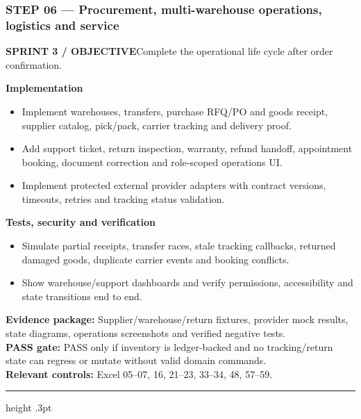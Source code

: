 \documentclass[10.5pt,a4paper,oneside]{article}
\newcommand{\eyebrow}[1]{{\sffamily\footnotesize\bfseries\color{gold}\MakeUppercase{#1}}}
\begin{document}
\subsubsection*{STEP 06 --- Procurement, multi-warehouse operations, logistics and service}
\eyebrow{Sprint 3 / objective}\quad Complete the operational life cycle after order confirmation.
\begin{tcolorbox}[colback=warm,colframe=line,boxrule=.45pt,arc=2pt,left=8pt,right=8pt,top=6pt,bottom=6pt]\textbf{Implementation}
\begin{itemize}
\item Implement warehouses, transfers, purchase RFQ/PO and goods receipt, supplier catalog, pick/pack, carrier tracking and delivery proof.
\item Add support ticket, return inspection, warranty, refund handoff, appointment booking, document correction and role-scoped operations UI.
\item Implement protected external provider adapters with contract versions, timeouts, retries and tracking status validation.
\end{itemize}
\textbf{Tests, security and verification}
\begin{itemize}
\item Simulate partial receipts, transfer races, stale tracking callbacks, returned damaged goods, duplicate carrier events and booking conflicts.
\item Show warehouse/support dashboards and verify permissions, accessibility and state transitions end to end.
\end{itemize}
\textbf{Evidence package:} Supplier/warehouse/return fixtures, provider mock results, state diagrams, operations screenshots and verified negative tests.\\
\textbf{PASS gate:} PASS only if inventory is ledger-backed and no tracking/return state can regress or mutate without valid domain commands.\\
\textbf{Relevant controls:} Excel 05--07, 16, 21--23, 33--34, 48, 57--59.
\end{tcolorbox}
\medskip\hrule height .3pt\medskip\Needspace{100mm}
\end{document}

